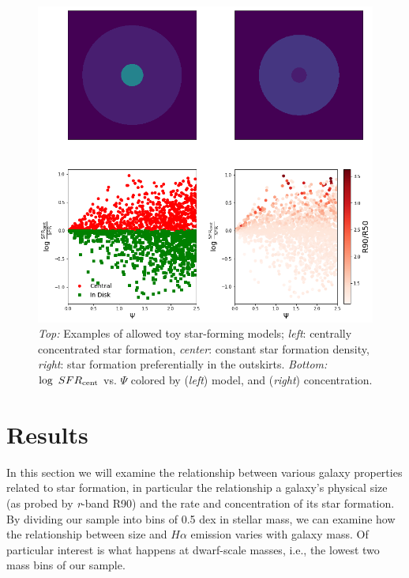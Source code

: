 \documentclass[iop]{emulateapj}
\begin{document}
\begin{figure}
	\centering
	\includegraphics[width=1.4 \columnwidth]{model.png}
	\caption{\textit{Top:} Examples of allowed toy star-forming models; \textit{left}: centrally concentrated star formation, \textit{center}: constant star formation density, \textit{right}: star formation preferentially in the outskirts. \textit{Bottom:} $\log \  SFR_{\rm cent}$ vs. $\Psi$ colored by (\textit{left}) model, and (\textit{right}) concentration.}
	\label{fig:model}
	
\end{figure}


\section{Results}
\label{sec:results}

In this section we will examine the relationship between various galaxy properties related to star formation, in particular the relationship a galaxy's physical size (as probed by \textit{r}-band R90) and the rate and concentration of its star formation. By dividing our sample into bins of 0.5 dex in stellar mass, we can examine how the relationship between size and $H\alpha$ emission varies with galaxy mass. Of particular interest is what happens at dwarf-scale masses, i.e., the lowest two mass bins of our sample.
\end{document}
